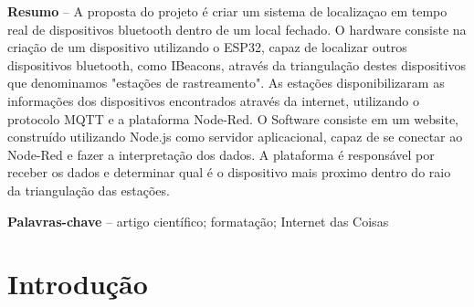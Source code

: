 \documentclass[
	article,			%
	12pt,				%
	oneside,			%
	a4paper,			%
	english,			%
	brazil,				%
	sumario=tradicional
	]{abntex2}
\begin{document}
\textual

\pagestyle{meuestilo}

\frenchspacing 

\maketitle

\thispagestyle{meuestilo}

\begin{changemargin}{1cm}{1cm} 
 \textbf{Resumo} – A proposta do projeto é criar um sistema de localizaçao em tempo real de dispositivos bluetooth dentro de um local fechado.
 O hardware consiste na criação de um dispositivo utilizando o ESP32, capaz de localizar outros dispositivos bluetooth, como IBeacons, através da triangulação destes dispositivos que denominamos "estações de rastreamento". 
 As estações disponibilizaram as informações dos dispositivos encontrados através da internet, utilizando o protocolo MQTT e a plataforma Node-Red.
 O Software consiste em um website, construído utilizando Node.js como servidor aplicacional, capaz de se conectar ao Node-Red e fazer a interpretação dos dados.
 A plataforma é responsável por receber os dados e determinar qual é o dispositivo mais proximo dentro do raio da triangulação das estações.
 \vspace{\onelineskip}
 
 \noindent
 \textbf{Palavras-chave} – artigo científico; formatação; Internet das Coisas 
\end{changemargin}


\section{Introdução}

\let\thefootnote\svthefootnote
\end{document}
